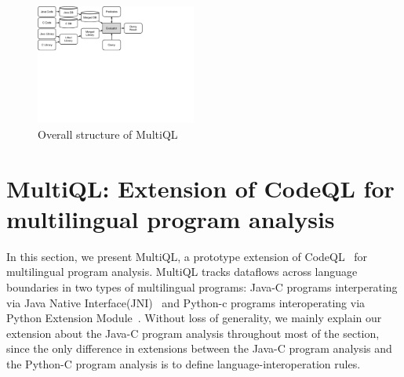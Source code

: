 \begin{figure}[t]
  \centering
  \vspace{2mm}
  \includegraphics[width=0.47\textwidth]{img/codeql.pdf}
  \caption{Overall structure of MultiQL}
  \label{fig:codeql}
\end{figure}

\section{MultiQL: Extension of CodeQL for multilingual program analysis}\label{sec:impl}
In this section, we present MultiQL, a prototype extension of
CodeQL~\cite{codeql} for multilingual program analysis.  MultiQL tracks
dataflows across language boundaries in two types of multilingual programs:
Java-C programs interperating via Java Native Interface(JNI)~\cite{jnispec} and
Python-c programs interoperating via Python Extension Module~\cite{pyext}.
Without loss of generality, we mainly explain our extension about the Java-C
program analysis throughout most of the section, since the only difference in
extensions between the Java-C program analysis and the Python-C program
analysis is to define language-interoperation rules.




